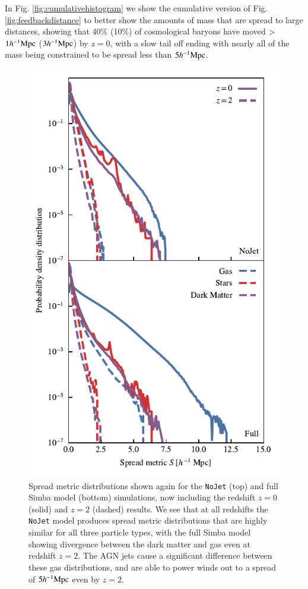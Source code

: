 \documentclass[fleqn,usenatbib]{mnras}
\newcommand{\hmpc}{h^{-1}{\rm Mpc}}
\newcommand{\simba}{{\sc Simba}}
\newcommand{\nojet}{{\tt NoJet}}
\begin{document}
In Fig. \ref{fig:cumulativehistogram} we show the cumulative version of Fig.
\ref{fig:feedbackdistance} to better show the amounts of mass that are spread
to large distances, showing that 40\% (10\%) of cosmological baryons have
moved > $1\hmpc{}$ ($3\hmpc{}$) by $z = 0$, with a slow tail off ending with
nearly all of the mass being constrained to be spread less than $5\hmpc{}$.

\begin{figure}
    \centering
    \includegraphics[width=\columnwidth]{figures/neighbour_analysis_hist_redshift.pdf}
    \vspace{-0.7cm}
    \caption{Spread metric distributions shown again for the
    \nojet{} (top) and full \simba{} model (bottom) simulations, now including
    the redshift $z=0$ (solid) and $z=2$ (dashed) results. We see that at all
    redshifts the \nojet{} model produces spread metric distributions that
    are highly similar for all three particle types, with the full \simba{}
    model showing divergence between the dark matter and gas even at
    redshift $z=2$. The AGN jets cause a significant difference between
    these gas distributions, and are able to power winds out to a spread of
    $5\hmpc{}$ even by $z=2$.}
    \label{fig:zevodist}
\end{figure}
\end{document}
